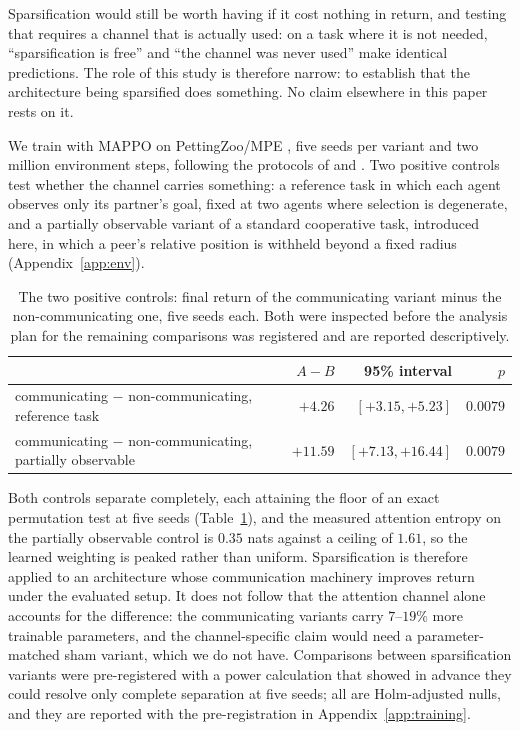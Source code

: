 Sparsification would still be worth having if it cost nothing in return, and
testing that requires a channel that is actually used: on a task where it is not
needed, ``sparsification is free'' and ``the channel was never used'' make
identical predictions. The role of this study is therefore narrow: to
establish that the architecture being sparsified does something. No claim
elsewhere in this paper rests on it.

We train with MAPPO \citep{yu2022mappo} on PettingZoo/MPE
\citep{terry2020pettingzoo}, five seeds per variant and two million environment
steps, following the protocols of \citet{papoudakis2021epymarl} and
\citet{agarwal2021rliable}. Two positive controls test whether the channel
carries something: a reference task in which each agent observes only its
partner's goal, fixed at two agents where selection is degenerate, and a
partially observable variant of a standard cooperative task, introduced here, in
which a peer's relative position is withheld beyond a fixed radius
(Appendix~\ref{app:env}).

\begin{table}[t]
\centering\small
\caption{The two positive controls: final return of the communicating variant
minus the non-communicating one, five seeds each. Both were inspected before the
analysis plan for the remaining comparisons was registered and are reported
descriptively.}
\label{tab:training}
\begin{tabular}{lrrr}
\toprule
& $A-B$ & 95\% interval & $p$ \\
\midrule
communicating $-$ non-communicating, reference task
  & $+4.26$ & $[+3.15, +5.23]$ & $0.0079$ \\
communicating $-$ non-communicating, partially observable
  & $+11.59$ & $[+7.13, +16.44]$ & $0.0079$ \\
\bottomrule
\end{tabular}
\end{table}

Both controls separate completely, each attaining the floor of an exact
permutation test at five seeds (Table~\ref{tab:training}), and the measured
attention entropy on the partially observable control is $0.35$ nats against a
ceiling of $1.61$, so the learned weighting is peaked rather than uniform.
Sparsification is therefore applied to an architecture whose communication
machinery improves return under the evaluated setup. It does not follow that the
attention channel alone accounts for the difference: the communicating variants
carry $7$--$19\%$ more trainable parameters, and the channel-specific claim
would need a parameter-matched sham variant, which we do not have. Comparisons
between sparsification variants were pre-registered with a power calculation
that showed in advance they could resolve only complete separation at five
seeds; all are Holm-adjusted nulls, and they are reported with the
pre-registration in Appendix~\ref{app:training}.

